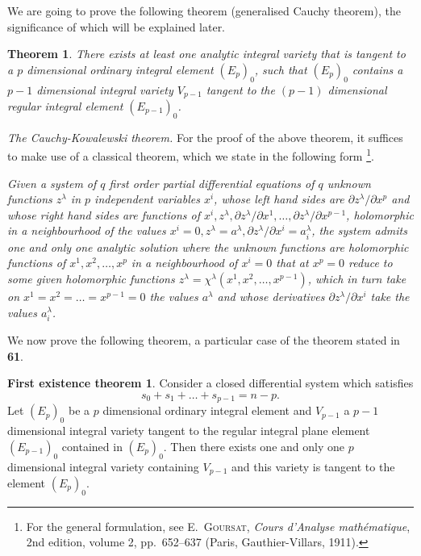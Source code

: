 \documentclass[leqno,11pt]{book}
\numberwithin{equation}{chapter}
\newcommand{\pd}{\partial}
\theoremstyle{shape1}
\newtheorem*{thm*}{\hspace{15pt}Theorem}
\theoremstyle{shape0}
\theoremstyle{shape2}
\theoremstyle{definition}
\begin{document}
We are going to prove the following theorem (generalised Cauchy theorem), the significance of which will be explained later.
\begin{thm*}
  There exists at least one analytic integral variety that is tangent to a $p$ dimensional ordinary integral element $(E_{p})_{0}$, such that $(E_{p})_{0}$ contains a $p-1$ dimensional integral variety $V_{p-1}$ tangent to the $(p-1)$ dimensional  regular integral element $(E_{p-1})_{0}$.
\end{thm*}


\vspace{12pt}\fsec \emph{The Cauchy-Kowalewski theorem.} For the proof of the above theorem, it suffices to make use of a classical theorem, which we state in the following form \footnote{For the general formulation, see \textsc{E.~Goursat}, \emph{Cours d'Analyse math\'ematique}, 2nd edition, volume 2, pp.~652--637 (Paris, Gauthier-Villars, 1911).}.

\emph{Given a system of $q$ first order partial differential equations of $q$ unknown functions $z^{\lambda}$ in $p$ independent variables $x^{i}$, whose left hand sides are $\pd z^{\lambda}/\pd x^{p}$ and whose right hand sides are  functions of $x^{i},z^{\lambda},\pd z^{\lambda}/\pd x^{1},\dots,\pd z^{\lambda}/\pd x^{p-1}$, holomorphic in a neighbourhood of the values $x^{i}=0,z^{\lambda}=a^{\lambda},\pd z^{\lambda}/\pd x^{i}=a^{\lambda}_{i}$, the system admits one and only one analytic solution where the unknown functions are holomorphic functions of $x^{1},x^{2},\dots,x^{p}$ in a neighbourhood of $x^{i}=0$ that at $x^{p}=0$ reduce to some given holomorphic functions $z^{\lambda}=\chi^{\lambda}(x^{1},x^{2},\dots,x^{p-1})$, which in turn take on $x^{1}=x^{2}=\dots=x^{p-1}=0$ the values $a^{\lambda}$ and whose derivatives $\pd z^{\lambda}/\pd x^{i}$ take the values $a^{\lambda}_{i}$.}


\vspace{12pt}\fsec We now prove the following theorem,  a particular case of the theorem stated in \textsection\textbf{61}.

\newtheorem*{thmexs1}{\hspace{15pt}First existence theorem}
\begin{thmexs1}
  Consider a closed differential system which satisfies
\[
s_{0}+s_{1}+\dots+s_{p-1}=n-p.
\]
Let $(E_{p})_{0}$ be a $p$ dimensional ordinary integral element and $V_{p-1}$ a $p-1$ dimensional integral variety tangent to the regular integral plane element $(E_{p-1})_{0}$ contained in $(E_{p})_{0}$. Then there exists one and only one $p$ dimensional integral variety containing $V_{p-1}$ and this variety is tangent to the element $(E_{p})_{0}$.
\end{thmexs1}
\end{document}
